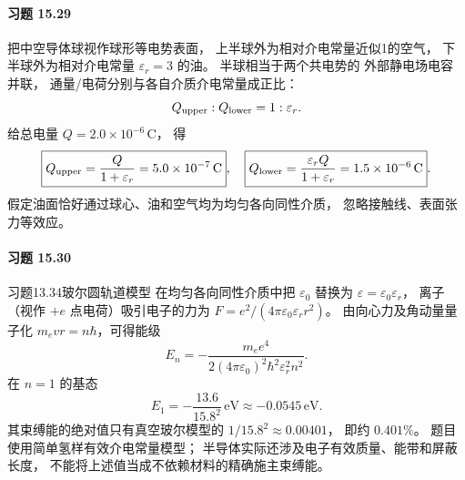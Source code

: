 \paragraph{习题 15.29}
把中空导体球视作球形等电势表面，
上半球外为相对介电常量近似1的空气，
下半球外为相对介电常量
\(\varepsilon_r=3\) 的油。
半球相当于两个共电势的
外部静电场电容并联，
通量/电荷分别与各自介质介电常量成正比：
\[
 Q_{\rm upper}:Q_{\rm lower}=1:\varepsilon_r.
\]
给总电量 \(Q=2.0\times10^{-6}\,\mathrm C\)，
得
\[
 \boxed{Q_{\rm upper}=\frac{Q}{1+\varepsilon_r}
 =5.0\times10^{-7}\,\mathrm C},\quad
 \boxed{Q_{\rm lower}=\frac{\varepsilon_rQ}{1+\varepsilon_r}
 =1.5\times10^{-6}\,\mathrm C}.
\]
假定油面恰好通过球心、油和空气均为均匀各向同性介质，
忽略接触线、表面张力等效应。

\paragraph{习题 15.30}
习题13.34玻尔圆轨道模型
在均匀各向同性介质中把
\(\varepsilon_0\) 替换为
\(\varepsilon=\varepsilon_0\varepsilon_r\)，
离子（视作 \(+e\) 点电荷）吸引电子的力为
\(F=e^2/(4\pi\varepsilon_0\varepsilon_r r^2)\)。
由向心力及角动量量子化
\(m_evr=n\hbar\)，可得能级
\[
 \boxed{E_n=-\frac{m_ee^4}
 {2(4\pi\varepsilon_0)^2\hbar^2
 \varepsilon_r^2 n^2}}.
\]
在 \(n=1\) 的基态
\[
 \boxed{E_1=-\frac{13.6}{15.8^2}\,\mathrm{eV}
 \approx-0.0545\,\mathrm{eV}}.
\]
其束缚能的绝对值只有真空玻尔模型的
\(1/15.8^2\approx0.00401\)，
即约 \(0.401\%\)。
题目使用简单氢样有效介电常量模型；
半导体实际还涉及电子有效质量、能带和屏蔽长度，
不能将上述值当成不依赖材料的精确施主束缚能。
